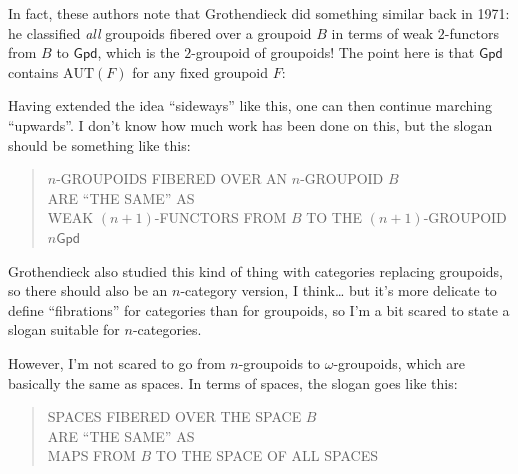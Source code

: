 \documentclass{article}
\def\tightlist{}
\renewcommand{\texttt}[1]{%
  \begingroup
  \ttfamily
  \begingroup\lccode`~=`/\lowercase{\endgroup\def~}{/\discretionary{}{}{}}%
  \begingroup\lccode`~=`[\lowercase{\endgroup\def~}{[\discretionary{}{}{}}%
  \begingroup\lccode`~=`.\lowercase{\endgroup\def~}{.\discretionary{}{}{}}%
  \catcode`/=\active\catcode`[=\active\catcode`.=\active
  \scantokens{#1\noexpand}%
  \endgroup
}
\begin{document}

In fact, these authors note that Grothendieck did something similar back
in 1971: he classified \emph{all} groupoids fibered over a groupoid
\(B\) in terms of weak \(2\)-functors from \(B\) to \(\mathsf{Gpd}\),
which is the \(2\)-groupoid of groupoids! The point here is that
\(\mathsf{Gpd}\) contains \(\mathrm{AUT}(F)\) for any fixed groupoid
\(F\):


Having extended the idea ``sideways'' like this, one can then continue
marching ``upwards''. I don't know how much work has been done on this,
but the slogan should be something like this:

\begin{quote}
\(n\)-GROUPOIDS FIBERED OVER AN \(n\)-GROUPOID \(B\)\\
ARE ``THE SAME'' AS\\
WEAK \((n+1)\)-FUNCTORS FROM \(B\) TO THE \((n+1)\)-GROUPOID
\(n\mathsf{Gpd}\)
\end{quote}

Grothendieck also studied this kind of thing with categories replacing
groupoids, so there should also be an \(n\)-category version, I
think\ldots{} but it's more delicate to define ``fibrations'' for
categories than for groupoids, so I'm a bit scared to state a slogan
suitable for \(n\)-categories.

However, I'm not scared to go from \(n\)-groupoids to
\(\omega\)-groupoids, which are basically the same as spaces. In terms
of spaces, the slogan goes like this:

\begin{quote}
SPACES FIBERED OVER THE SPACE \(B\)\\
ARE ``THE SAME'' AS\\
MAPS FROM \(B\) TO THE SPACE OF ALL SPACES
\end{quote}
\end{document}
